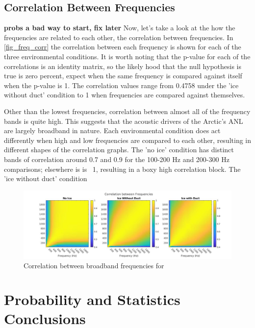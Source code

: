 \subsection{Correlation Between Frequencies}

\textbf{probs a bad way to start, fix later }Now, let's take a look at the how the frequencies are related to each other, the correlation between frequencies. In \autoref{fig_freq_corr} the correlation between each frequency is shown for each of the three environmental conditions. It is worth noting that the p-value for each of the correlations is an identity matrix, so the likely hood that the null hypothesis is true is zero percent, expect when the same frequency is compared against itself when the p-value is 1. The correlation values range from 0.4758 under the 'ice without duct' condition to 1 when frequencies are compared against themselves. 

Other than the lowest frequencies, correlation between almost all of the frequency bands is quite high. This suggests that the acoustic drivers of the Arctic's ANL are largely broadband in nature. Each environmental condition does act differently when high and low frequencies are compared to each other, resulting in different shapes of the correlation graphs. The 'no ice' condition has distinct bands of correlation around 0.7 and 0.9 for the 100-200 Hz and 200-300 Hz comparisons; elsewhere is is ~1, resulting in a boxy high correlation block. The 'ice without duct' condition  

\begin{figure}[h]
\centering
\includegraphics[scale=0.38]{Figures/corr_all_1x3.jpg}
\caption{Correlation between broadband frequencies for }
\label{fig_freq_corr}
\end{figure}




\section{Probability and Statistics Conclusions}

